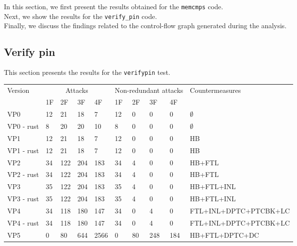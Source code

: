 \label{Section:result section}
In this section, we first present the results obtained for the \texttt{memcmps} code.\\
Next, we show the results for the \texttt{verify\_pin} code.\\
Finally, we discuss the findings related to the control-flow graph generated during the analysis.

\subsection{Verify pin}
This section presents the results for the \texttt{verifypin} test.

\begin{table}[t]
\centering
\begin{tabular}{l|llll|llll|l}
Version    & \multicolumn{4}{c|}{Attacks} & \multicolumn{4}{c|}{Non-redundant attacks} & Countermeasures \\
           & 1F & 2F & 3F & 4F & 1F & 2F & 3F & 4F &                 \\
\hline
\hline
VP0        & 12 & 21  & 18  & 7    & 12 & 0  & 0   & 0   & $\emptyset$           \\
VP0 - rust & 8  & 20  & 20  & 10   & 8  & 0  & 0   & 0   & $\emptyset$           \\
\hline
VP1        & 12 & 21  & 18  & 7    & 12 & 0  & 0   & 0   & HB                    \\
VP1 - rust & 12 & 21  & 18  & 7    & 12 & 0  & 0   & 0   & HB                    \\
\hline
VP2        & 34 & 122 & 204 & 183  & 34 & 4  & 0   & 0   & HB+FTL                \\
VP2 - rust & 34 & 122 & 204 & 183  & 34 & 4  & 0   & 0   & HB+FTL                \\
\hline
VP3        & 35 & 122 & 204 & 183  & 35 & 4  & 0   & 0   & HB+FTL+INL            \\
VP3 - rust & 35 & 122 & 204 & 183  & 35 & 4  & 0   & 0   & HB+FTL+INL            \\
\hline
VP4        & 34 & 118 & 180 & 147  & 34 & 0  & 4   & 0   & FTL+INL+DPTC+PTCBK+LC \\
VP4 - rust & 34 & 118 & 180 & 147  & 34 & 0  & 4   & 0   & FTL+INL+DPTC+PTCBK+LC \\
\hline
VP5        & 0  & 80  & 644 & 2566 & 0  & 80 & 248 & 184 & HB+FTL+DPTC+DC        \\

\end{tabular}
\end{table}
